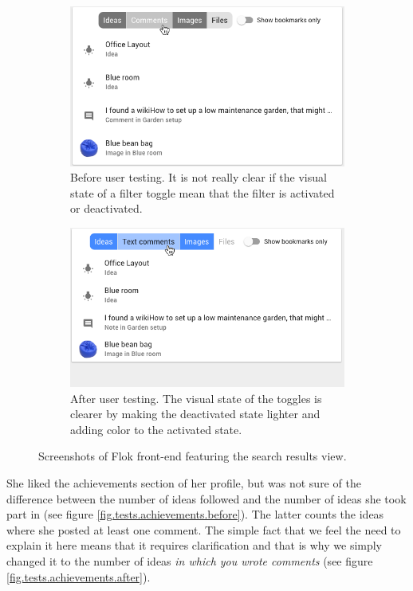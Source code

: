 \documentclass[a4paper,12pt, oneside]{article}
\begin{document}
\begin{figure}[!htb]
    \begin{subfigure}[t]{.495\textwidth}
        \includegraphics[width=\textwidth]{images/user_tests/search_before.png}
        \caption{Before user testing. It is not really clear if the visual state of a filter toggle mean that the filter is activated or deactivated.}
        \label{fig.tests.search.before}
    \end{subfigure}
    \hfill
    \begin{subfigure}[t]{.495\textwidth}
        \includegraphics[width=\textwidth]{images/user_tests/search_after.png}
        \caption{After user testing. The visual state of the toggles is clearer by making the deactivated state lighter and adding color to the activated state.}
        \label{fig.tests.search.after}
    \end{subfigure}
    \caption{Screenshots of Flok front-end featuring the search results view.}
    \label{fig.tests.search}
\end{figure}

She liked the achievements section of her profile, but was not sure of the difference between the number of ideas followed and the number of ideas she took part in (see figure \ref{fig.tests.achievements.before}).
The latter counts the ideas where she posted at least one comment.
The simple fact that we feel the need to explain it here means that it requires clarification and that is why we simply changed it to the number of ideas \emph{in which you wrote comments} (see figure \ref{fig.tests.achievements.after}).
\end{document}
